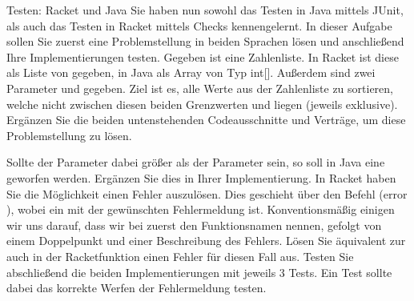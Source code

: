 \documentclass{../preamble}
\begin{document}
\begin{task}[credit = \stars{2}{3}]{Testen: Racket und Java}
    Sie haben nun sowohl das Testen in Java mittels JUnit, als auch das Testen in Racket mittels Checks kennengelernt. In dieser Aufgabe sollen Sie zuerst eine Problemstellung in beiden Sprachen lösen und anschließend Ihre Implementierungen testen.
    \br
    Gegeben ist eine Zahlenliste. In Racket ist diese als Liste von  gegeben, in Java als Array von Typ \textcolor{keywordcolor}{int}[]. Außerdem sind zwei Parameter  und  gegeben. Ziel ist es, alle Werte aus der Zahlenliste zu sortieren, welche nicht zwischen diesen beiden Grenzwerten  und  liegen (jeweils exklusive).
    \br
    Ergänzen Sie die beiden untenstehenden Codeausschnitte und Verträge, um diese Problemstellung zu lösen.
    
    
    Sollte der Parameter  dabei größer als der Parameter  sein, so soll in Java eine
    \newline
    \newline
    geworfen werden. Ergänzen Sie dies in Ihrer Implementierung.
    \br
    In Racket haben Sie die Möglichkeit einen Fehler auszulösen. Dies geschieht über den Befehl (\textcolor{keywordcolor}{error} ), wobei  ein  mit der gewünschten Fehlermeldung ist. Konventionsmäßig einigen wir uns darauf, dass wir bei  zuerst den Funktionsnamen nennen, gefolgt von einem Doppelpunkt und einer Beschreibung des Fehlers. Lösen Sie äquivalent zur  auch in der Racketfunktion einen Fehler für diesen Fall aus.
    \br
    Testen Sie abschließend die beiden Implementierungen mit jeweils 3 Tests. Ein Test sollte dabei das korrekte Werfen der Fehlermeldung testen.

    \clearpage

    \begin{solution}
        

        \clearpage

        

        \clearpage

        

        \clearpage

        
    \end{solution}
\end{task}
\end{document}
